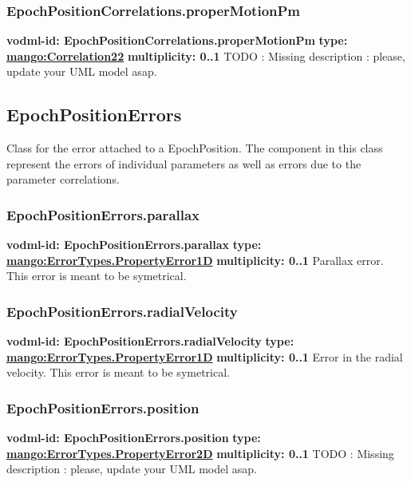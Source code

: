     \subsubsection{EpochPositionCorrelations.properMotionPm}
      \textbf{vodml-id: EpochPositionCorrelations.properMotionPm} \newline
      \textbf{type: \hyperref[sect:Correlation22]{mango:Correlation22}} \newline
      \textbf{multiplicity: 0..1} \newline 
      TODO : Missing description : please, update your UML model asap.

  \subsection{EpochPositionErrors}
  \label{sect:EpochPositionErrors}
    Class for the error attached to a EpochPosition. The component in this class represent the errors of individual parameters as well as errors due to the parameter correlations.

    \subsubsection{EpochPositionErrors.parallax}
      \textbf{vodml-id: EpochPositionErrors.parallax} \newline
      \textbf{type: \hyperref[sect:ErrorTypes.PropertyError1D]{mango:ErrorTypes.PropertyError1D}} \newline
      \textbf{multiplicity: 0..1} \newline 
      Parallax error. This error is meant to be symetrical.

    \subsubsection{EpochPositionErrors.radialVelocity}
      \textbf{vodml-id: EpochPositionErrors.radialVelocity} \newline
      \textbf{type: \hyperref[sect:ErrorTypes.PropertyError1D]{mango:ErrorTypes.PropertyError1D}} \newline
      \textbf{multiplicity: 0..1} \newline 
      Error in the radial velocity. This error is meant to be symetrical.

    \subsubsection{EpochPositionErrors.position}
      \textbf{vodml-id: EpochPositionErrors.position} \newline
      \textbf{type: \hyperref[sect:ErrorTypes.PropertyError2D]{mango:ErrorTypes.PropertyError2D}} \newline
      \textbf{multiplicity: 0..1} \newline 
      TODO : Missing description : please, update your UML model asap.

